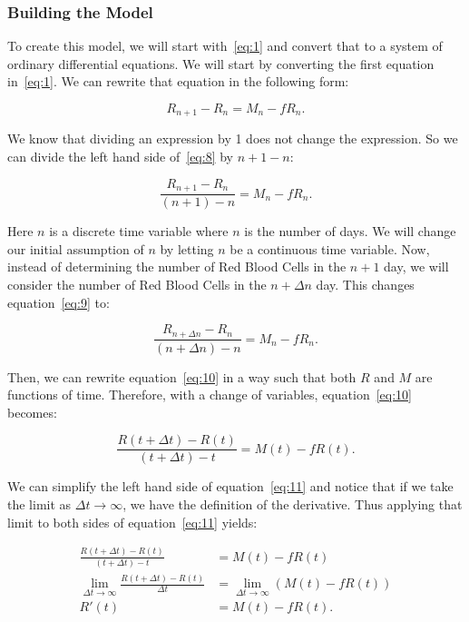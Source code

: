 \subsubsection{Building the Model}

To create this model, we will start with~\eqref{eq:1} and convert that to a system of ordinary differential equations. We will start by converting the first equation in~\eqref{eq:1}. We can rewrite that equation in the following form:

\begin{equation} \label{eq:8}
    R_{n+1} - R_n = M_n - fR_n.
\end{equation}

We know that dividing an expression by 1 does not change the expression. So we can divide the left hand side of~\eqref{eq:8} by $n+1-n$:

\begin{equation} \label{eq:9}
    \frac{R_{n+1} - R_n}{(n+1)-n} = M_n - fR_n.
\end{equation}

Here $n$ is a discrete time variable where $n$ is the number of days. We will change our initial assumption of $n$ by letting $n$ be a continuous time variable. Now, instead of determining the number of Red Blood Cells in the $n+1$ day, we will consider the number of Red Blood Cells in the $n+\Delta n$ day. This changes equation~\eqref{eq:9} to:

\begin{equation} \label{eq:10}
    \frac{R_{n+\Delta n} - R_n}{(n+\Delta n)-n} = M_n - fR_n.
\end{equation}

Then, we can rewrite equation~\eqref{eq:10} in a way such that both $R$ and $M$ are functions of time. Therefore, with a change of variables, equation~\eqref{eq:10} becomes:

\begin{equation} \label{eq:11}
    \frac{R(t+\Delta t) - R(t)}{(t+\Delta t)-t} = M(t) - fR(t).
\end{equation}

We can simplify the left hand side of equation~\eqref{eq:11} and notice that if we take the limit as $\Delta t\to\infty$, we have the definition of the derivative. Thus applying that limit to both sides of equation~\eqref{eq:11} yields:

\begin{align} 
    \frac{R(t+\Delta t) - R(t)}{(t+\Delta t)-t} &= M(t) - fR(t) \nonumber\\
    \lim_{\Delta t\to\infty} \frac{R(t+\Delta t) - R(t)}{\Delta t} &= \lim_{\Delta t\to\infty} (M(t) - fR(t)) \nonumber\\
    R'(t) &= M(t) - fR(t). \label{eq:12}
\end{align}

